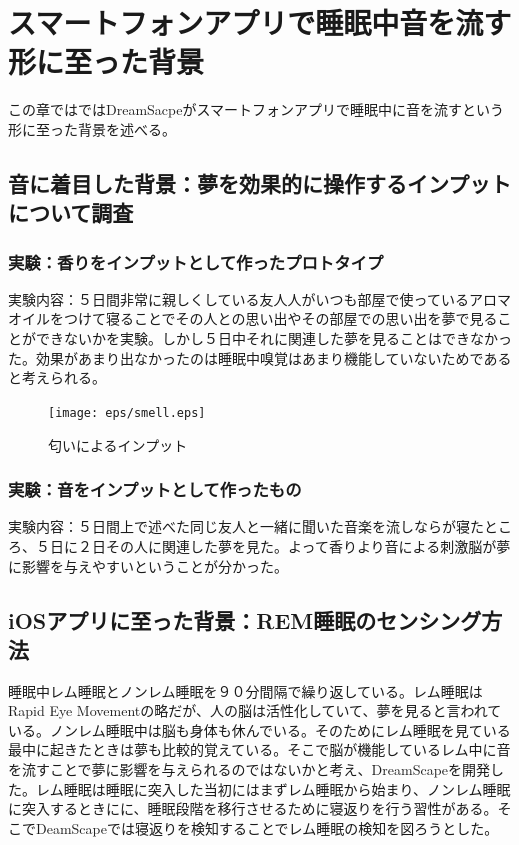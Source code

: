 \chapter{スマートフォンアプリで睡眠中音を流す形に至った背景}
\label{chap:visualize}

この章ではではDreamSacpeがスマートフォンアプリで睡眠中に音を流すという形に至った背景を述べる。

\section{音に着目した背景：夢を効果的に操作するインプットについて調査}
\subsection{実験：香りをインプットとして作ったプロトタイプ}
実験内容：５日間非常に親しくしている友人人がいつも部屋で使っているアロマオイルをつけて寝ることでその人との思い出やその部屋での思い出を夢で見ることができないかを実験。しかし５日中それに関連した夢を見ることはできなかった。効果があまり出なかったのは睡眠中嗅覚はあまり機能していないためであると考えられる。
\begin{figure}[htbp]
\begin{center}
\texttt{[image: eps/smell.eps]}
\caption{匂いによるインプット}
\label{匂いによるインプット}
\end{center}
\end{figure}

\subsection{実験：音をインプットとして作ったもの}
実験内容：５日間上で述べた同じ友人と一緒に聞いた音楽を流しならが寝たところ、５日に２日その人に関連した夢を見た。よって香りより音による刺激脳が夢に影響を与えやすいということが分かった。

\section{iOSアプリに至った背景：REM睡眠のセンシング方法}
睡眠中レム睡眠とノンレム睡眠を９０分間隔で繰り返している。レム睡眠はRapid Eye Movementの略だが、人の脳は活性化していて、夢を見ると言われている。ノンレム睡眠中は脳も身体も休んでいる。そのためにレム睡眠を見ている最中に起きたときは夢も比較的覚えている\cite{remNonRem}。そこで脳が機能しているレム中に音を流すことで夢に影響を与えられるのではないかと考え、DreamScapeを開発した。レム睡眠は睡眠に突入した当初にはまずレム睡眠から始まり、ノンレム睡眠に突入するときにに、睡眠段階を移行させるために寝返りを行う習性がある\cite{negaeri}。そこでDeamScapeでは寝返りを検知することでレム睡眠の検知を図ろうとした。

